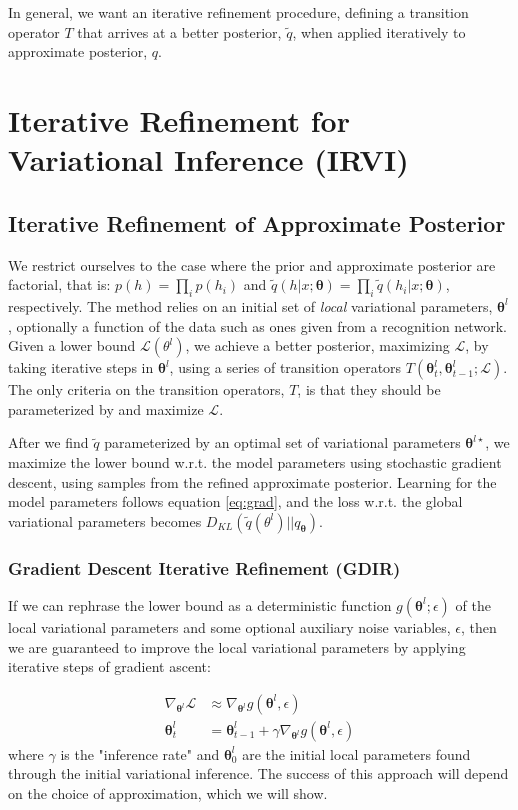 \documentclass{article} %
\newcommand{\vects}[1]{\boldsymbol{#1}}
\newcommand{\TT}[0]{\vects{\theta}}
\newcommand{\grad}[0]{\nabla}
\newcommand{\LL}[0]{\mathcal{L}}
\begin{document}
In general, we want an iterative refinement procedure, defining a transition
operator $T$ that arrives at a better posterior, $\tilde{q}$, when applied
iteratively to approximate posterior, $q$. 

\section{Iterative Refinement for Variational Inference (IRVI)}

\subsection{Iterative Refinement of Approximate Posterior}
We restrict ourselves to the case where the prior and approximate posterior are
factorial, that is: $p(h) = \prod_i p(h_i)$ and $\tilde{q}(h|x; \TT) = \prod_i
\tilde{q}(h_i|x; \TT)$, respectively. The method relies on an initial set of \emph{local} variational parameters, $\TT^l$, optionally a function of the data
such as ones given from a recognition network. Given a lower bound $\LL(\theta^l)$, we achieve a better posterior, maximizing $\LL$, by taking iterative steps 
in $\TT^l$, using a series of transition operators $T(\TT^l_t, \TT^l_{t-1}; \LL)$. 
The only criteria on the transition operators, $T$, is that they should be parameterized by and maximize $\LL$.

After we find $\tilde{q}$ parameterized by an optimal set of variational parameters $\TT^{l\star}$, we maximize the lower bound w.r.t. the model
parameters using stochastic gradient descent, using samples from the refined
approximate posterior. Learning for the model parameters follows equation \ref{eq:grad}, and the loss w.r.t. the global variational parameters becomes
$D_{KL}(\tilde{q}(\theta^l)||q_{\TT})$.

\subsubsection{Gradient Descent Iterative Refinement (GDIR)}
If we can rephrase the lower bound as a deterministic function $g(\TT^l; \epsilon)$ of the local
variational parameters and some optional auxiliary noise variables, $\epsilon$,
then we are guaranteed to improve the local variational parameters by applying iterative steps
of gradient ascent:

\begin{align}
\grad_{\TT^l} \LL &\approx \grad_{\TT^l} g(\TT^l, \epsilon) \nonumber \\
\TT^l_t &= \TT^l_{t-1} + \gamma \grad_{\TT^l} g(\TT^l, \epsilon)
\end{align}
where $\gamma$ is the "inference rate" and $\TT^l_0$ are the initial local
parameters found through the initial variational inference. The success of this
approach will depend on the choice of approximation, which we will show.
\end{document}
